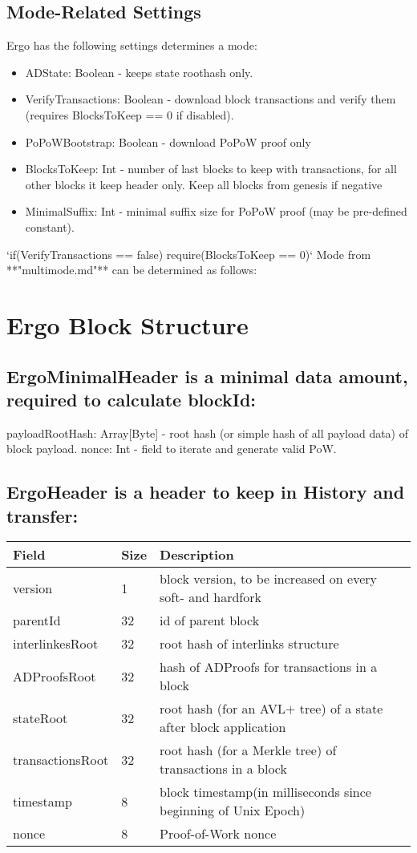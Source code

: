 \documentclass[]{report}   %
\begin{document}
\subsection{Mode-Related Settings}
Ergo has the following settings determines a mode:
\begin{itemize}
\item ADState: Boolean - keeps state roothash only.
\item VerifyTransactions: Boolean - download block transactions and verify them (requires BlocksToKeep == 0 if disabled).
\item PoPoWBootstrap: Boolean - download PoPoW proof only
\item BlocksToKeep: Int - number of last blocks to keep with transactions, for all other blocks it keep header
only. Keep all blocks from genesis if negative
\item MinimalSuffix: Int - minimal suffix size for PoPoW proof (may be pre-defined constant).
\end{itemize}
\par 
‘if(VerifyTransactions == false) require(BlocksToKeep == 0)‘ Mode from **"multimode.md"** can be determined as follows:

\section{Ergo Block Structure}
\subsection{ErgoMinimalHeader is a minimal data amount, required to calculate blockId:}
payloadRootHash: Array[Byte] - root hash (or simple hash of all payload data) of block payload.
nonce: Int - field to iterate and generate valid PoW.
\subsection{ErgoHeader is a header to keep in History and transfer:}
\begin{tabular}{ |p{3cm}||p{3cm}|p{3cm}|  }
 \hline
 \hline
 Field     &  Size &  Description  \\
 \hline
 version  &  1 &  block version, to be increased on every soft- and hardfork  \\
 \hline
 parentId &  32 &  id of parent block  \\
 \hline
 interlinkesRoot &  32 &  root hash of interlinks structure  \\
 \hline
 ADProofsRoot &  32 &  hash of ADProofs for transactions in a block \\
 \hline
 stateRoot &  32 &  root hash (for an AVL+ tree) of a state after block application  \\
 \hline
 transactionsRoot  &  32 &  root hash (for a Merkle tree) of transactions in a block  \\
 \hline
 timestamp &  8 &  block timestamp(in milliseconds since beginning of Unix Epoch)  \\
 \hline
 nonce &  8 &  Proof-of-Work nonce  \\
 \hline
\end{tabular}
\end{document}
